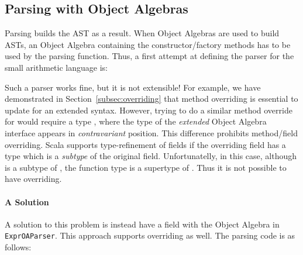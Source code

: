 \subsection{Parsing with Object Algebras}\label{subsec:parsingwithoa}

Parsing builds the AST as a result. When Object Algebras are used
to build ASTs, an Object Algebra containing the constructor/factory
methods has to be used by the parsing function. Thus, a first attempt
at defining the parser for the small arithmetic language is:

\begin{comment}
\inlinecode{ExprAlg} is defined for a small language using Object Algebras. Since Object Algebras represent ``objects'' implicitly as functions like \inlinecode{ExprAlg[E] =>} \inlinecode{E} for abstract \inlinecode{E}, we first try to build the corresponding parser by type \inlinecode{ExprAlg[E] =>} \inlinecode{Parser[E]}.
\end{comment}

Such a parser works fine, but it is not extensible! For example, we have demonstrated in Section~\ref{subsec:overriding} that method overriding is essential to update  for an extended syntax. However, trying to do a similar method override for  would require a type  , where the type of the \emph{extended} Object Algebra interface appears in \emph{contravariant} position. This difference prohibits method/field overriding. Scala supports type-refinement of fields if the overriding
field has a type which is a \emph{subtype} of the original field.
Unfortunatelly, in this case, although  is a subtype
of , the function type   is a supertype of  . Thus it is not possible to have overriding.


\paragraph{A Solution}
A solution to this problem is instead have a field with the Object Algebra
in \lstinline{ExprOAParser}. This approach supports overriding as well.
The parsing code is as follows:

